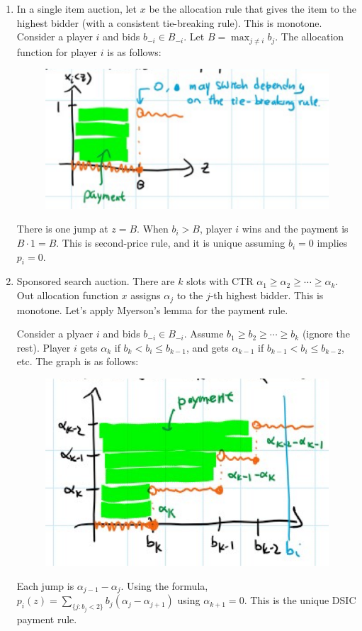 \documentclass[twoside]{article}
\begin{document}
	\begin{enumerate}
		\item In a single item auction, let $x$ be the allocation rule that gives the item to the highest bidder (with a consistent tie-breaking rule). This is monotone. Consider a player $i$ and bids $b_{-i} \in B_{-i}$. Let $B = \max_{j \neq i} b_j$. 
		      The allocation function for player $i$ is as follows: 
		      \begin{center}
		      	\begin{figure}[h!]
		      		\includegraphics[width=.7\textwidth]{myerson_4.png}
		      	\end{figure}
		      \end{center}
		      There is one jump at $z = B$. When $b_i > B$, player $i$ wins and the payment is $B \cdot 1 = B$. This is second-price rule, and it is unique assuming $b_i = 0$ implies $p_i = 0$. 
		\item Sponsored search auction. There are $k$ slots with CTR $\alpha_1 \geq \alpha_2 \geq \cdots \geq \alpha_k$. Out allocation function $x$ assigns $\alpha_j$ to the $j$-th highest bidder. This is monotone. Let's apply Myerson's lemma for the payment rule. 
		      
		      Consider a plyaer $i$ and bids $b_{-i} \in B_{-i}$. Assume $b_1 \geq b_2 \geq \cdots \geq b_k$ (ignore the rest). Player $i$ gets $\alpha_k$ if $b_k < b_i \leq b_{k-1}$, and gets $\alpha_{k-1}$ if $b_{k-1} < b_i \leq b_{k-2}$, etc. The graph is as follows: 
		      \begin{center}
		      	\begin{figure}[h!]
		      		\includegraphics[width=.5\textwidth]{myerson_5.png}
		      	\end{figure}
		      \end{center}
		      Each jump is $\alpha_{j-1} - \alpha_j$. Using the formula, $p_i(z) = \sum_{\{j : b_j < 2\}} b_j(\alpha_j - \alpha_{j+1})$ using $\alpha_{k+1} = 0$. This is the unique DSIC payment rule.
		      

\end{enumerate}
\end{document}

